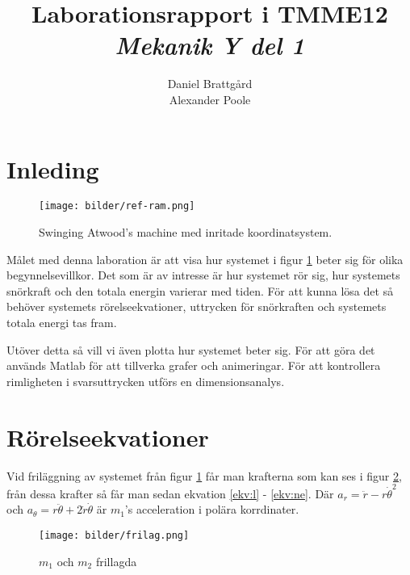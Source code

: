 \documentclass[a4paper,12pt]{article}
\title{Laborationsrapport i TMME12\\ \emph{Mekanik Y del 1}}
\author{Daniel Brattg\r{a}rd \\Alexander Poole\\}
\begin{document}
\maketitle
\thispagestyle{empty}
\newpage


\pagebreak

\tableofcontents

\pagebreak

\section{Inleding}

\begin{figure}[!ht]
\centering
\texttt{[image: bilder/ref-ram.png]}
\caption{Swinging Atwood's machine med inritade koordinatsystem.}
\label{fig:ref-ram}
\end{figure}

Målet med denna laboration är att visa hur systemet i figur \ref{fig:ref-ram} beter sig för olika begynnelsevillkor. Det som är av intresse är hur systemet rör sig, hur systemets snörkraft och den totala energin varierar med tiden. För att kunna lösa det så behöver systemets rörelseekvationer, uttrycken för snörkraften och systemets totala energi tas fram. 

Utöver detta så vill vi även plotta hur systemet beter sig. För att göra det används Matlab för att tillverka grafer och animeringar. För att kontrollera rimligheten i svarsuttrycken utförs en dimensionsanalys. 


\section{Rörelseekvationer}

Vid friläggning av systemet från figur \ref{fig:ref-ram} får man krafterna som kan ses i figur \ref{fig:frilag}, från dessa krafter så får man sedan ekvation \ref{ekv:l} - \ref{ekv:ne}. Där $a_r=\ddot{r}-r\dot{\theta}^2$ och $a_{\theta}=r\ddot{\theta}+2\dot{r}\dot{\theta}$ är $m_1$'s acceleration i polära korrdinater. 

\begin{figure}[!ht]
\centering
\texttt{[image: bilder/frilag.png]}
\caption{$m_1$ och $m_2$ frillagda}
\label{fig:frilag}
\end{figure}
\end{document}
